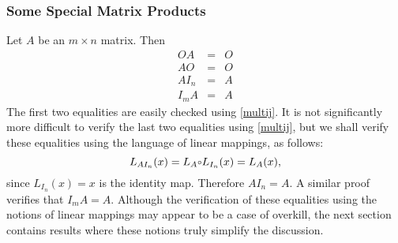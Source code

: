 \documentclass{ximera}
\begin{document}
\subsubsection*{Some Special Matrix Products}

Let $A$ be an $m\times n$ matrix.  Then
\begin{eqnarray*}
OA & = & O \\
AO & = & O \\
AI_n & = & A \\
I_mA & = & A
\end{eqnarray*}
The first two equalities are easily checked using \eqref{multij}.
It is not significantly more difficult to verify the last two
equalities using \eqref{multij}, but we shall verify these
equalities using the language of linear mappings, as follows:
\[
L_{AI_n}(x)=L_A\compose L_{I_n}(x)=L_A(x),
\]
since $L_{I_n}(x)=x$ is the identity map.  Therefore $AI_n=A$.
A similar proof verifies that $I_mA=A$.  Although the
verification of these equalities using the notions of linear
mappings may appear to be a case of overkill, the next section
contains results where these notions truly simplify the discussion.

\EXER

\end{document}
